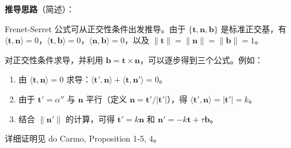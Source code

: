 \textbf{推导思路}（简述）：

Frenet-Serret 公式可从正交性条件出发推导。由于 $\{\mathbf{t}, \mathbf{n}, \mathbf{b}\}$ 是标准正交基，有 $\langle \mathbf{t}, \mathbf{n} \rangle = 0$，$\langle \mathbf{t}, \mathbf{b} \rangle = 0$，$\langle \mathbf{n}, \mathbf{b} \rangle = 0$，以及 $\|\mathbf{t}\| = \|\mathbf{n}\| = \|\mathbf{b}\| = 1$。

对正交性条件求导，并利用 $\mathbf{b} = \mathbf{t} \times \mathbf{n}$，可以逐步得到三个公式。例如：

\begin{enumerate}
\item 由 $\langle \mathbf{t}, \mathbf{n} \rangle = 0$ 求导：$\langle \mathbf{t}', \mathbf{n} \rangle + \langle \mathbf{t}, \mathbf{n}' \rangle = 0$。
\item 由于 $\mathbf{t}' = \alpha''$ 与 $\mathbf{n}$ 平行（定义 $\mathbf{n} = \mathbf{t}'/|\mathbf{t}'|$），得 $\langle \mathbf{t}', \mathbf{n} \rangle = |\mathbf{t}'| = k$。
\item 结合 $\|\mathbf{n}'\|$ 的计算，可得 $\mathbf{t}' = k\mathbf{n}$ 和 $\mathbf{n}' = -k\mathbf{t} + \tau\mathbf{b}$。
\end{enumerate}

详细证明见 do Carmo, Proposition 1-5, 4。
